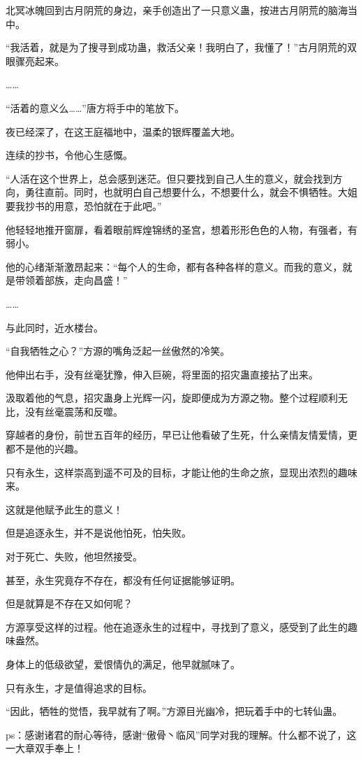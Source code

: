 \begin{this_body}
北冥冰魄回到古月阴荒的身边，亲手创造出了一只意义蛊，按进古月阴荒的脑海当中。

“我活着，就是为了搜寻到成功蛊，救活父亲！我明白了，我懂了！”古月阴荒的双眼骤亮起来。

……

“活着的意义么……”唐方将手中的笔放下。

夜已经深了，在这王庭福地中，温柔的银辉覆盖大地。

连续的抄书，令他心生感慨。

“人活在这个世界上，总会感到迷茫。但只要找到自己人生的意义，就会找到方向，勇往直前。同时，也就明白自己想要什么，不想要什么，就会不惧牺牲。大姐要我抄书的用意，恐怕就在于此吧。”

他轻轻地推开窗扉，看着眼前辉煌锦绣的圣宫，想着形形色色的人物，有强者，有弱小。

他的心绪渐渐激昂起来：“每个人的生命，都有各种各样的意义。而我的意义，就是带领着部族，走向昌盛！”

……

与此同时，近水楼台。

“自我牺牲之心？”方源的嘴角泛起一丝傲然的冷笑。

他伸出右手，没有丝毫犹豫，伸入巨碗，将里面的招灾蛊直接拈了出来。

汲取着他的气息，招灾蛊身上光辉一闪，旋即便成为方源之物。整个过程顺利无比，没有丝毫震荡和反噬。

穿越者的身份，前世五百年的经历，早已让他看破了生死，什么亲情友情爱情，更都不是他的兴趣。

只有永生，这样崇高到遥不可及的目标，才能让他的生命之旅，显现出浓烈的趣味来。

这就是他赋予此生的意义！

但是追逐永生，并不是说他怕死，怕失败。

对于死亡、失败，他坦然接受。

甚至，永生究竟存不存在，都没有任何证据能够证明。

但是就算是不存在又如何呢？

方源享受这样的过程。他在追逐永生的过程中，寻找到了意义，感受到了此生的趣味盎然。

身体上的低级欲望，爱恨情仇的满足，他早就腻味了。

只有永生，才是值得追求的目标。

“因此，牺牲的觉悟，我早就有了啊。”方源目光幽冷，把玩着手中的七转仙蛊。

ps：感谢诸君的耐心等待，感谢“傲骨丶临风”同学对我的理解。什么都不说了，这一大章双手奉上！

\end{this_body}

